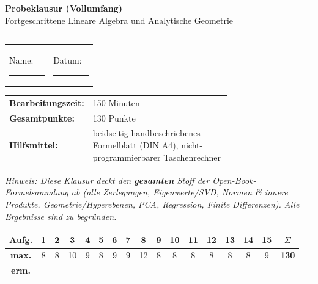 \documentclass[a4paper,11pt]{article}
\begin{document}
\color{fg}

\thispagestyle{fancy}

\begin{center}
  {\color{accent}\LARGE\bfseries Probeklausur (Vollumfang)}\\[0.3em]
  {\color{fg}\large Fortgeschrittene Lineare Algebra und Analytische Geometrie}\\[0.6em]
  {\color{gridcolor}\rule{\linewidth}{0.4pt}}
\end{center}

\vspace{0.4em}

\renewcommand{\arraystretch}{1.6}
\begin{tabular}{@{}p{0.5\linewidth}@{}p{0.5\linewidth}@{}}
  Name: \ \rule[-2pt]{0.7\linewidth}{0.4pt} &
  Datum: \ \rule[-2pt]{0.55\linewidth}{0.4pt}
\end{tabular}

\vspace{0.6em}

\begin{tabular}{@{}l p{0.72\linewidth}@{}}
  \textbf{\color{accent}Bearbeitungszeit:} & 150 Minuten \\
  \textbf{\color{accent}Gesamtpunkte:}     & 130 Punkte \\
  \textbf{\color{accent}Hilfsmittel:}      & beidseitig handbeschriebenes Formelblatt (DIN A4), nicht-programmierbarer Taschenrechner \\
\end{tabular}

\vspace{0.4em}

\textit{\color{fg}\small Hinweis: Diese Klausur deckt den \textbf{gesamten} Stoff der Open-Book-Formelsammlung ab (alle Zerlegungen, Eigenwerte/SVD, Normen \& innere Produkte, Geometrie/Hyperebenen, PCA, Regression, Finite Differenzen). Alle Ergebnisse sind zu begründen.}

\vspace{0.9em}

\renewcommand{\arraystretch}{1.5}
\noindent
\begin{tabular}{|c|*{15}{c|}c|}
\hline
\scriptsize\textbf{Aufg.} & 1 & 2 & 3 & 4 & 5 & 6 & 7 & 8 & 9 & 10 & 11 & 12 & 13 & 14 & 15 & \textbf{$\Sigma$} \\
\hline
\scriptsize\textbf{max.} & 8 & 8 & 10 & 9 & 8 & 9 & 9 & 12 & 8 & 8 & 8 & 8 & 8 & 8 & 9 & \textbf{130} \\
\hline
\scriptsize\textbf{erm.} & & & & & & & & & & & & & & & & \\
\hline
\end{tabular}
\end{document}
